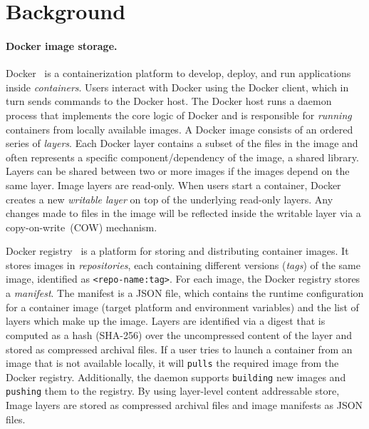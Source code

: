 \section{Background}
\label{sec:background}

\paragraph{Docker image storage.} Docker~\cite{docker} is a containerization
platform to develop, deploy, and run applications inside \emph{containers}.
Users interact with Docker using the Docker client, which in turn sends
commands to the Docker host.  The Docker host runs a daemon process that
implements the core logic of Docker and is responsible for \emph{running}
containers from locally available images.  A Docker image consists of an
ordered series of \emph{layers}.  Each Docker layer contains a subset of the
files in the image and often represents a specific component/dependency of the
image, \eg a shared library.  Layers can be shared between two or more images
if the images depend on the same layer.  Image layers are read-only.  When
users start a container, Docker creates a new \emph{writable layer} on top of
the underlying read-only layers.
Any changes made to files in the image will be reflected inside the writable
layer via a copy-on-write~(COW) mechanism.

% 
%


Docker registry~\cite{docker-hub} is a platform for storing and distributing container
images. It stores images in \emph{repositories}, each containing different
versions (\emph{tags}) of the same image, identified as
\texttt{<repo-name:tag>}.  For each image, the Docker registry stores a
\emph{manifest}.
The manifest is a JSON file, which contains the runtime configuration for a
container image (\eg target platform and environment variables) and the list
of layers which make up the image.
Layers are identified via a digest that is computed as a hash (SHA-256) over
the uncompressed content of the layer and stored as compressed archival files.
If a user tries to launch a container from an image that is not available
locally, it will \texttt{pulls} the required image from the Docker registry.
Additionally, the daemon supports \texttt{building} new images and
\texttt{pushing} them to the registry.  By using layer-level content
addressable store, Image layers are stored as compressed archival files and
image manifests as JSON files.

